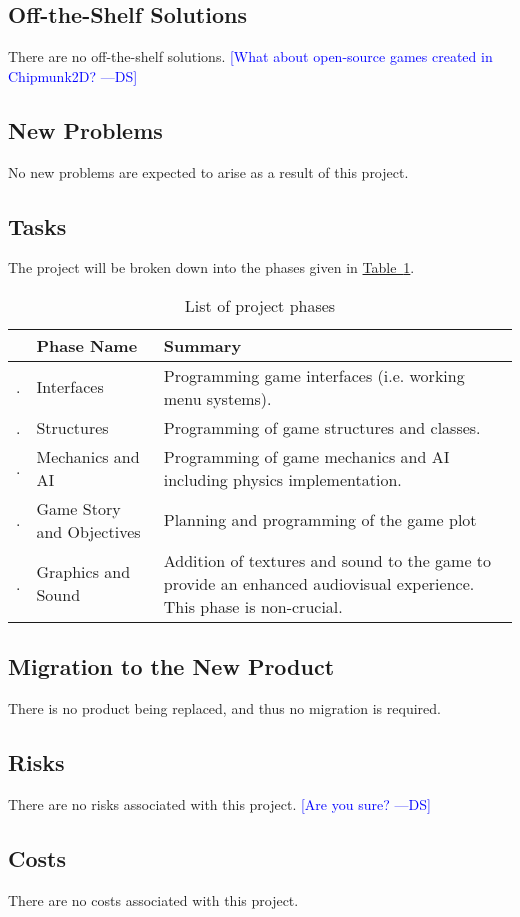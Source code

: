 \documentclass[12pt, titlepage]{article}
\newcounter{PhaseList}
\newcommand{\printPhase}{
    \stepcounter{PhaseList}
    \arabic{PhaseList}.
}
\newcommand{\authornote}[3]{\textcolor{#1}{[#3 ---#2]}}
\newcommand{\authornote}[3]{}
\newcommand{\ds}[1]{\authornote{blue}{DS}{#1}}
\begin{document}
\subsection{Off-the-Shelf Solutions}
There are no off-the-shelf solutions.
\ds{What about open-source games created in Chipmunk2D?}

\subsection{New Problems}
No new problems are expected to arise as a result of this project.
\subsection{Tasks}
The project will be broken down into the phases given in \hyperref[tab:phases]{Table~\ref*{tab:phases}}.
\begin{table}[h]
\caption{List of project phases} \label{tab:phases}
\begin{tabularx}{\textwidth}{p{0.5cm}>{\raggedright}p{4.5cm}X}
\toprule & {\bf Phase Name} & {\bf Summary}\\
\midrule
\printPhase & Interfaces & Programming game interfaces (i.e. working menu systems).\\
\printPhase & Structures & Programming of game structures and classes.\\
\printPhase & Mechanics and AI & Programming of game mechanics and AI including physics implementation.\\ 
\printPhase & Game Story and Objectives & Planning and programming of the game plot\\
\printPhase & Graphics and Sound & Addition of textures and sound to the game to provide an enhanced audiovisual experience.  This phase is non-crucial. \\
\bottomrule
\end{tabularx}
\end{table}
\subsection{Migration to the New Product}
There is no product being replaced, and thus no migration is required.
\subsection{Risks}
There are no risks associated with this project.
\ds{Are you sure?}
\subsection{Costs}
There are no costs associated with this project.
\end{document}
